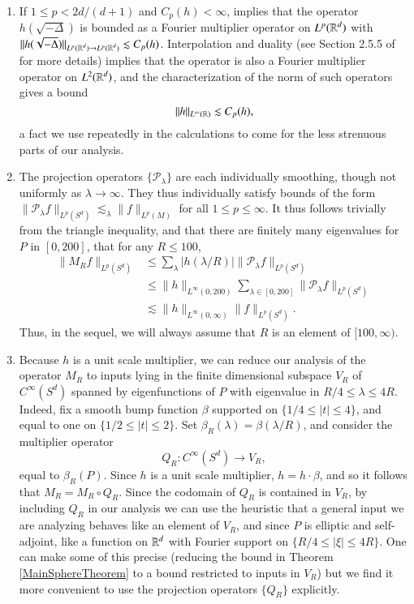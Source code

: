 \begin{remarks}
    \ 
\begin{enumerate}
    \item If $1 \leq p < 2d/(d+1)$ and $C_p(h) < \infty$, \cite{HeoandNazarovandSeeger} implies that the operator $h(\sqrt{-\Delta})$ is bounded as a Fourier multiplier operator on $L^p(\operatorname{\mathbb{R}}^d)$ with $\| h(\sqrt{-\Delta}) \|_{L^p(\operatorname{\mathbb{R}}^d) \to L^p(\operatorname{\mathbb{R}}^d)} \lesssim C_p(h)$. Interpolation and duality (see Section 2.5.5 of \cite{Grafakos} for more details) implies that the operator is also a Fourier multiplier operator on $L^2(\operatorname{\mathbb{R}}^d)$, and the characterization of the norm of such operators gives a bound
    \[ \| h \|_{L^\infty(\operatorname{\mathbb{R}})} \lesssim C_p(h), \]
    a fact we use repeatedly in the calculations to come for the less strenuous parts of our analysis.

    \item The projection operators $\{ \mathcal{P}_\lambda \}$ are each individually smoothing, though not uniformly as $\lambda \to \infty$. They thus individually satisfy bounds of the form $\| \mathcal{P}_\lambda f \|_{L^p(S^d)} \lesssim_\lambda \| f \|_{L^p(M)}$ for all $1 \leq p \leq \infty$. It thus follows trivially from the triangle inequality, and that there are finitely many eigenvalues for $P$ in $[0,200]$, that for any $R \leq 100$,
    \begin{align*}
        \| M_R f \|_{L^p(S^d)} &\leq \sum_\lambda |h(\lambda/R)| \| \mathcal{P}_\lambda f \|_{L^p(S^d)}\\
        &\leq \| h \|_{L^\infty(0,200)} \sum\nolimits_{\lambda \in [0,200]} \| \mathcal{P}_\lambda f \|_{L^p(S^d)}\\
        &\lesssim \| h \|_{L^\infty(0,\infty)} \| f \|_{L^p(S^d)}.
    \end{align*}
    Thus, in the sequel, we will always assume that $R$ is an element of $[100,\infty)$.

    \item Because $h$ is a unit scale multiplier, we can reduce our analysis of the operator $M_R$ to inputs lying in the finite dimensional subspace $V_R$ of $C^\infty(S^d)$ spanned by eigenfunctions of $P$ with eigenvalue in $R/4 \leq \lambda \leq 4R$. Indeed, fix a smooth bump function $\beta$ supported on $\{ 1/4 \leq |t| \leq 4 \}$, and equal to one on $\{ 1/2 \leq |t| \leq 2 \}$. Set $\beta_R(\lambda) = \beta(\lambda / R)$, and consider the multiplier operator
    \[ Q_R: C^\infty(S^d) \to V_R, \]
    equal to $\beta_R( P )$. Since $h$ is a unit scale multiplier, $h = h \cdot \beta$, and so it follows that $M_R = M_R \circ Q_R$. Since the codomain of $Q_R$ is contained in $V_R$, by including $Q_R$ in our analysis we can use the heuristic that a general input we are analyzing behaves like an element of $V_R$, and since $P$ is elliptic and self-adjoint, like a function on $\operatorname{\mathbb{R}}^d$ with Fourier support on $\{ R/4 \leq |\xi| \leq 4R \}$. One can make some of this precise (reducing the bound in Theorem \ref{MainSphereTheorem} to a bound restricted to inputs in $V_R$) but we find it more convenient to use the projection operators $\{ Q_R \}$ explicitly.


\end{enumerate}
\end{remarks}
